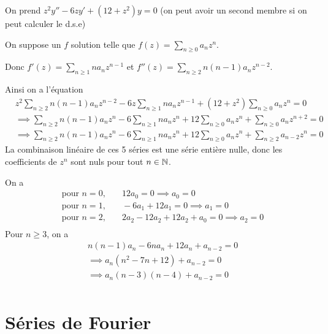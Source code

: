 \documentclass[a4paper,12pt]{article}
\begin{document}
\begin{exemple}
    On prend $z^2 y'' - 6 z y' + (12 + z^2) y = 0$ (on peut avoir un second membre si on peut calculer le d.s.e)

    On suppose un $f$ solution telle que $f(z) = \sum_{n \geq 0} a_n z^n$.

    Donc $f'(z) = \sum_{n \geq 1} n a_n z^{n - 1}$ et $f''(z) = \sum_{n \geq 2} n (n - 1) a_n z^{n - 2}$.

    Ainsi on a l'équation
    \begin{align*}
        &z^2 \sum_{n \geq 2} n (n - 1) a_n z^{n - 2} - 6 z \sum_{n \geq 1} n a_n z^{n - 1} + (12 + z^2) \sum_{n \geq 0} a_n z^n = 0 \\
        &\implies \sum_{n \geq 2} n (n - 1) a_n z^n - 6 \sum_{n \geq 1} n a_n z^n + 12 \sum_{n \geq 0} a_n z^n + \sum_{n \geq 0} a_n z^{n + 2} = 0 \\
        &\implies \sum_{n \geq 2} n (n - 1) a_n z^n - 6 \sum_{n \geq 1} n a_n z^n + 12 \sum_{n \geq 0} a_n z^n + \sum_{n \geq 2} a_{n-2} z^n = 0
    \end{align*}
    La combinaison linéaire de ces 5 séries est une série entière nulle, donc les coefficients de $z^n$ sont nuls pour tout $n \in \mathbb{N}$.

    On a
    \begin{align*}
        &\text{pour } n = 0, &\quad 12 a_0 = 0 \implies a_0 = 0 \\
        &\text{pour } n = 1, &\quad -6 a_1 + 12 a_1 = 0 \implies a_1 = 0 \\
        &\text{pour } n = 2, &\quad 2 a_2 - 12 a_2 + 12 a_2 + a_0 = 0 \implies a_2 = 0 \\
    \end{align*}
    Pour $n \geq 3$, on a
    \begin{align*}
        &n (n - 1) a_n - 6 n a_n + 12 a_n + a_{n - 2} = 0 \\
        &\implies a_n(n^2 - 7 n + 12) + a_{n - 2} = 0 \\
        &\implies a_n(n - 3)(n - 4) + a_{n - 2} = 0 \\
    \end{align*}
\end{exemple}

\clearpage

\section{Séries de Fourier}
\end{document}
